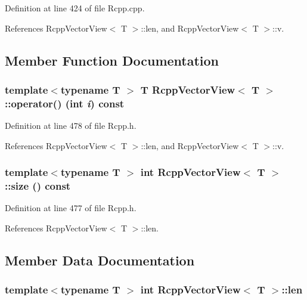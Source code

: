 Definition at line 424 of file Rcpp.cpp.

References RcppVectorView$<$ T $>$::len, and RcppVectorView$<$ T $>$::v.

\subsection{Member Function Documentation}
\hypertarget{classRcppVectorView_a13d63e990363a37ae29e0eab7400d297}{
\subsubsection[{operator()}]{\setlength{\rightskip}{0pt plus 5cm}template$<$typename T $>$ T {\bf RcppVectorView}$<$ T $>$::operator() (int {\em i}) const}}
\label{classRcppVectorView_a13d63e990363a37ae29e0eab7400d297}


Definition at line 478 of file Rcpp.h.

References RcppVectorView$<$ T $>$::len, and RcppVectorView$<$ T $>$::v.\hypertarget{classRcppVectorView_ad4c0f21296eb1cf7b2e2c8b8b43f4b0d}{
\subsubsection[{size}]{\setlength{\rightskip}{0pt plus 5cm}template$<$typename T $>$ int {\bf RcppVectorView}$<$ T $>$::size () const}}
\label{classRcppVectorView_ad4c0f21296eb1cf7b2e2c8b8b43f4b0d}


Definition at line 477 of file Rcpp.h.

References RcppVectorView$<$ T $>$::len.

\subsection{Member Data Documentation}
\hypertarget{classRcppVectorView_ada67f9b1481099e4a820deaf4648778b}{
\subsubsection[{len}]{\setlength{\rightskip}{0pt plus 5cm}template$<$typename T $>$ int {\bf RcppVectorView}$<$ T $>$::{\bf len}}}
\label{classRcppVectorView_ada67f9b1481099e4a820deaf4648778b}


